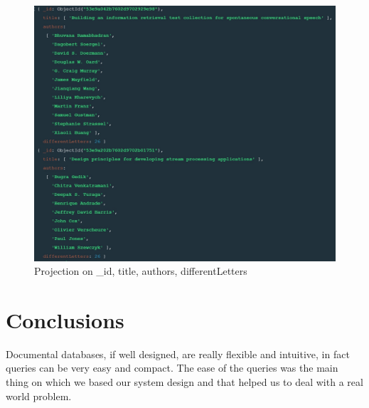 \documentclass{Configuration_Files/PoliMi3i_thesis}
\begin{document}
\begin{figure}[H]
\centering
\includegraphics[width=1\textwidth]{query/mongo_q11.jpeg}
\caption{Projection on \_id, title, authors, differentLetters}
\label{fig:query11}
\end{figure}


\chapter{Conclusions}
Documental databases, if well designed, are really flexible and intuitive, in fact queries can be very easy and compact.
The ease of the queries was the main thing on which we based our system design and that helped us to deal with a real
world problem.
\end{document}
